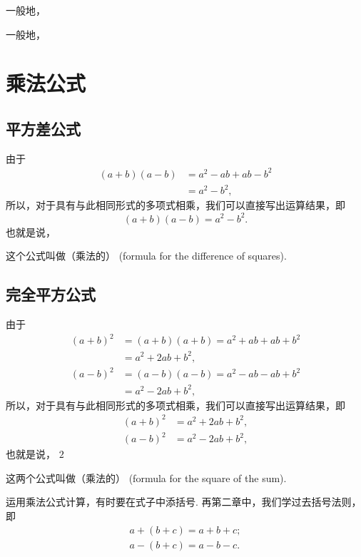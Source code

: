 \documentclass[UTF8,fontset=macnew]{book} %
\begin{document}
				一般地，\textcolor[RGB]{4,165,218}{}
				
				一般地，\textcolor[RGB]{4,165,218}{}
		\section{乘法公式}
			\subsection{平方差公式}
				由于
			$$\begin{aligned}(a+b)(a-b) &= a^2-ab+ab-b^2\\&=a^2-b^2,\end{aligned}$$
			所以，对于具有与此相同形式的多项式相乘，我们可以直接写出运算结果，即
			$$\boxed{(a+b)(a-b)=a^2-b^2.} $$
			也就是说，\textcolor[RGB]{4,165,218}{}
			
			这个公式叫做（乘法的）\textcolor[RGB]{4,165,218}{} (formula for the difference of squares).
			\subsection{完全平方公式}
				由于
			$$\begin{aligned}(a+b)^2&=(a+b)(a+b)=a^2+ab+ab+b^2\\&=a^2+2ab+b^2,\\(a-b)^2&=(a-b)(a-b)=a^2-ab-ab+b^2\\&=a^2-2ab+b^2,\end{aligned}$$
			所以，对于具有与此相同形式的多项式相乘，我们可以直接写出运算结果，即
			$$\boxed{\begin{aligned}(a+b)^2 &= a^2+2ab+b^2,\\ (a-b)^2 &= a^2-2ab+b^2,\end{aligned}} $$
			也就是说，\textcolor[RGB]{4,165,218}{ $2$ }
			
				这两个公式叫做（乘法的）\textcolor[RGB]{4,165,218}{} (formula for the square of the sum).
				
				运用乘法公式计算，有时要在式子中添括号. 再第二章中，我们学过去括号法则，即
			$$\begin{aligned}a+(b+c)=a+b+c;\\a-(b+c)=a-b-c.\end{aligned}$$
			
\end{document}
